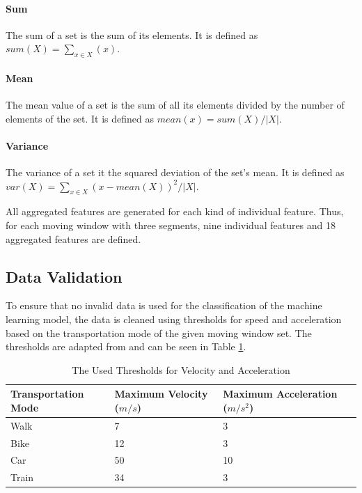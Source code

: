 \paragraph{Sum} The sum of a set is the sum of its elements. It is defined as $sum(X) = \sum_{x\in X} (x)$.

\paragraph{Mean} The mean value of a set is the sum of all its elements divided by the number of elements of the set. It is defined as $ mean (x) = sum(X)/|X|$.

\paragraph{Variance} The variance of a set it the squared deviation of the set's mean. It is defined as $var (X) = \sum_{x\in X} (x - mean(X))^2/|X| $.

All aggregated features are generated for each kind of individual feature. Thus, for each moving window with three segments, nine individual features and 18 aggregated features are defined. 

\subsection{Data Validation}

To ensure that no invalid data is used for the classification of the machine learning model, the data is cleaned using thresholds for speed and acceleration based on the transportation mode of the given moving window set. The thresholds are adapted from \cite{Dabiri2018} and can be seen in Table \ref{table:thresholds}.
 
\begin{table}[h!]
    \centering
    \begin{tabular}{|l l l l|} 
     \toprule
     Transportation Mode & Maximum Velocity ($m/s$) & Maximum Acceleration ($m/s^2$)\\
     \midrule
     Walk & 7 & 3 \\
     Bike & 12 & 3 \\
     Car & 50 & 10 \\
     Train & 34 & 3 \\
     \bottomrule
    \end{tabular}
    \caption{The Used Thresholds for Velocity and Acceleration \cite{Dabiri2018}}
    \label{table:thresholds}
\end{table}

